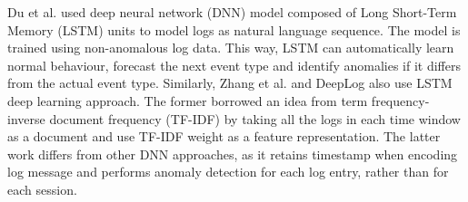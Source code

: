 Du et al. \cite{duLSTM2017} used deep neural network (DNN) model composed of Long Short-Term Memory (LSTM) units to model logs as natural language sequence. The model is trained using non-anomalous log data. This way, LSTM can automatically learn normal behaviour, forecast the next event type and identify anomalies if it differs from the actual event type. Similarly, Zhang et al. \cite{zhang2016} and DeepLog \cite{deeplog2017} also use LSTM deep learning approach. The former borrowed an idea from term frequency-inverse document frequency (TF-IDF) by taking all the logs in each time window as a document and use TF-IDF weight as a feature representation. The latter work differs from other DNN approaches, as it retains timestamp when encoding log message and performs anomaly detection for each log entry, rather than for each session.
